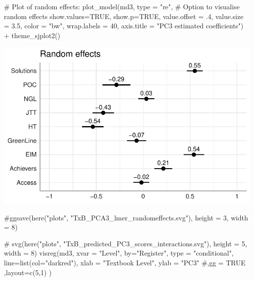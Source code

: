 \documentclass[
  letterpaper,
  DIV=11,
  numbers=noendperiod]{scrreprt}
\newenvironment{Shaded}{\begin{snugshade}}{\end{snugshade}}
\newcommand{\AttributeTok}[1]{\textcolor[rgb]{0.40,0.45,0.13}{#1}}
\newcommand{\CommentTok}[1]{\textcolor[rgb]{0.37,0.37,0.37}{#1}}
\newcommand{\ConstantTok}[1]{\textcolor[rgb]{0.56,0.35,0.01}{#1}}
\newcommand{\DecValTok}[1]{\textcolor[rgb]{0.68,0.00,0.00}{#1}}
\newcommand{\FloatTok}[1]{\textcolor[rgb]{0.68,0.00,0.00}{#1}}
\newcommand{\FunctionTok}[1]{\textcolor[rgb]{0.28,0.35,0.67}{#1}}
\newcommand{\NormalTok}[1]{\textcolor[rgb]{0.00,0.23,0.31}{#1}}
\newcommand{\SpecialCharTok}[1]{\textcolor[rgb]{0.37,0.37,0.37}{#1}}
\newcommand{\StringTok}[1]{\textcolor[rgb]{0.13,0.47,0.30}{#1}}
\begin{document}
\begin{Shaded}
\begin{Highlighting}[]
\CommentTok{\# Plot of random effects:}
\FunctionTok{plot\_model}\NormalTok{(md3, }
           \AttributeTok{type =} \StringTok{"re"}\NormalTok{, }\CommentTok{\# Option to visualise random effects}
           \AttributeTok{show.values=}\ConstantTok{TRUE}\NormalTok{, }
           \AttributeTok{show.p=}\ConstantTok{TRUE}\NormalTok{,}
           \AttributeTok{value.offset =}\NormalTok{ .}\DecValTok{4}\NormalTok{,}
           \AttributeTok{value.size =} \FloatTok{3.5}\NormalTok{,}
           \AttributeTok{color =} \StringTok{"bw"}\NormalTok{,}
           \AttributeTok{wrap.labels =} \DecValTok{40}\NormalTok{,}
           \AttributeTok{axis.title =} \StringTok{"PC3 estimated coefficients"}\NormalTok{) }\SpecialCharTok{+}
  \FunctionTok{theme\_sjplot2}\NormalTok{()}
\end{Highlighting}
\end{Shaded}

\includegraphics{AppendixF_files/figure-pdf/unnamed-chunk-30-1.pdf}

\begin{Shaded}
\begin{Highlighting}[]
\CommentTok{\#ggsave(here("plots", "TxB\_PCA3\_lmer\_randomeffects.svg"), height = 3, width = 8)}
\end{Highlighting}
\end{Shaded}

\begin{Shaded}
\begin{Highlighting}[]
\CommentTok{\# svg(here("plots", "TxB\_predicted\_PC3\_scores\_interactions.svg"), height = 5, width = 8)}
\FunctionTok{visreg}\NormalTok{(md3, }\AttributeTok{xvar =} \StringTok{"Level"}\NormalTok{, }\AttributeTok{by=}\StringTok{"Register"}\NormalTok{, }\AttributeTok{type =} \StringTok{"conditional"}\NormalTok{,}
       \AttributeTok{line=}\FunctionTok{list}\NormalTok{(}\AttributeTok{col=}\StringTok{"darkred"}\NormalTok{), }
       \AttributeTok{xlab =} \StringTok{"Textbook Level"}\NormalTok{, }\AttributeTok{ylab =} \StringTok{"PC3"}
       \CommentTok{\#,gg = TRUE}
\NormalTok{       ,}\AttributeTok{layout=}\FunctionTok{c}\NormalTok{(}\DecValTok{5}\NormalTok{,}\DecValTok{1}\NormalTok{)}
\NormalTok{)}
\end{Highlighting}
\end{Shaded}
\end{document}
